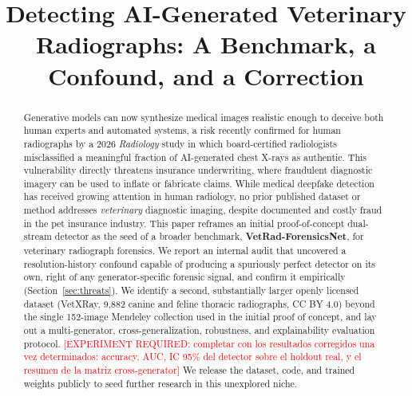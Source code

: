 \documentclass[journal]{IEEEtran}
\newcommand{\pending}[1]{\textcolor{red}{[EXPERIMENT REQUIRED: #1]}}
\begin{document}
\title{Detecting AI-Generated Veterinary Radiographs: A Benchmark, a Confound, and a Correction}

\author{
}

\maketitle

\begin{abstract}
Generative models can now synthesize medical images realistic enough to deceive both human experts and automated systems, a risk recently confirmed for human radiographs by a 2026 \textit{Radiology} study in which board-certified radiologists misclassified a meaningful fraction of AI-generated chest X-rays as authentic. This vulnerability directly threatens insurance underwriting, where fraudulent diagnostic imagery can be used to inflate or fabricate claims. While medical deepfake detection has received growing attention in human radiology, no prior published dataset or method addresses \emph{veterinary} diagnostic imaging, despite documented and costly fraud in the pet insurance industry. This paper reframes an initial proof-of-concept dual-stream detector as the seed of a broader benchmark, \textbf{VetRad-ForensicsNet}, for veterinary radiograph forensics. We report an internal audit that uncovered a resolution-history confound capable of producing a spuriously perfect detector on its own, right of any generator-specific forensic signal, and confirm it empirically (Section~\ref{sec:threats}). We identify a second, substantially larger openly licensed dataset (VetXRay, 9{,}882 canine and feline thoracic radiographs, CC BY 4.0) beyond the single 152-image Mendeley collection used in the initial proof of concept, and lay out a multi-generator, cross-generalization, robustness, and explainability evaluation protocol. \pending{completar con los resultados corregidos una vez determinados: accuracy, AUC, IC 95\% del detector sobre el holdout real, y el resumen de la matriz cross-generator} We release the dataset, code, and trained weights publicly to seed further research in this unexplored niche.
\end{abstract}
\end{document}
